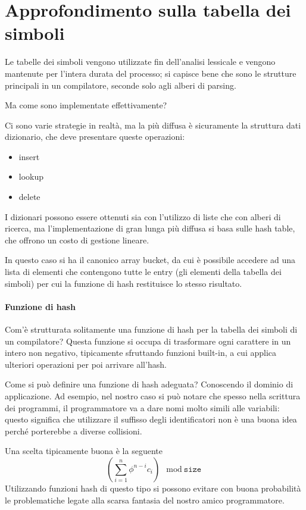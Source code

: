 \documentclass[class=book, crop=false, oneside, 12pt]{standalone}
\begin{document}
\section{Approfondimento sulla tabella dei simboli}
Le tabelle dei simboli vengono utilizzate fin dell'analisi lessicale e vengono mantenute per l'intera durata del processo; si capisce bene che sono le strutture principali in un compilatore, seconde solo agli alberi di parsing.

Ma come sono implementate effettivamente? 

Ci sono varie strategie in realtà, ma la più diffusa è sicuramente la struttura dati dizionario, che deve presentare queste operazioni:
\begin{itemize}
    \item insert
    \item lookup
    \item delete
\end{itemize}
I dizionari possono essere ottenuti sia con l'utilizzo di liste che con alberi di ricerca, ma l'implementazione di gran lunga più diffusa si basa sulle hash table, che offrono un costo di gestione lineare.

In questo caso si ha il canonico array bucket, da cui è possibile accedere ad una lista di elementi che contengono tutte le entry (gli elementi della tabella dei simboli) per cui la funzione di hash restituisce lo stesso risultato.

\paragraph{Funzione di hash} Com'è strutturata solitamente una funzione di hash per la tabella dei simboli di un compilatore?
Questa funzione si occupa di trasformare ogni carattere in un intero non negativo, tipicamente sfruttando funzioni built-in, a cui applica ulteriori operazioni per poi arrivare all'hash.

Come si può definire una funzione di hash adeguata?
Conoscendo il dominio di applicazione. Ad esempio, nel nostro caso si può notare che spesso nella scrittura dei programmi, il programmatore va a dare nomi molto simili alle variabili: questo significa che utilizzare il suffisso degli identificatori non è una buona idea perché porterebbe a diverse collisioni.

Una scelta tipicamente buona è la seguente
\begin{equation}
    \left(\sum_{i=1}^{n} \phi^{n-i}c_i\right) \mod \texttt{size}
\end{equation}
Utilizzando funzioni hash di questo tipo si possono evitare con buona probabilità le problematiche legate alla scarsa fantasia del nostro amico programmatore.
\end{document}
